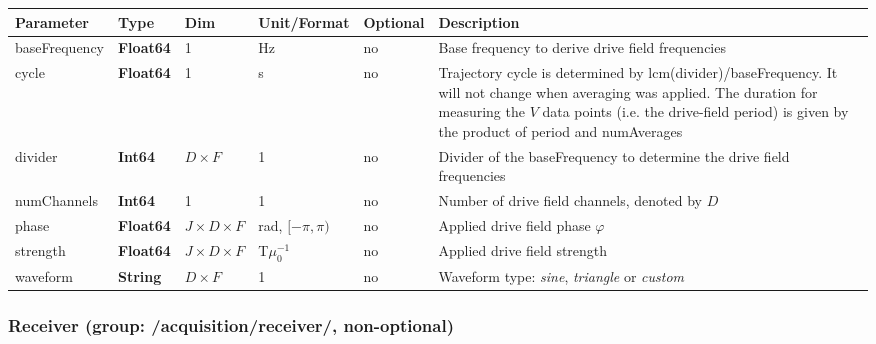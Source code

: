 \documentclass[landscape,a4paper]{article} %
\newcommand{\inltab}[1]{{\ttfamily\bfseries\color{blue}#1}}
\newcommand{\inlvar}[1]{{\ttfamily#1}}
\begin{document}
\setlength\extrarowheight{5pt}
\noindent \begin{tabularx}{\columnwidth}{lllllX} 
\textbf{Parameter} & \textbf{Type} & \textbf{Dim} & \textbf{Unit/Format} & \textbf{Optional} & \textbf{Description} \\ \hline 
\inlvar{baseFrequency} & \inltab{Float64} & 1 & Hz & no & Base frequency to derive drive field frequencies \\ \hline
\inlvar{cycle} & \inltab{Float64} & 1 & s & no & Trajectory cycle is determined by lcm(\inlvar{divider})/\inlvar{baseFrequency}. It will not change when averaging was applied. The duration for measuring the $V$ data points (i.e. the drive-field period) is given by the product of  \inlvar{period} and \inlvar{numAverages} \\ \hline
\inlvar{divider} & \inltab{Int64} & $D \times F$ & 1 & no & Divider of the \inlvar{baseFrequency} to determine the drive field frequencies \\ \hline
\inlvar{numChannels} & \inltab{Int64} & 1 & 1 & no & Number of drive field channels, denoted by $D$ \\ \hline
\inlvar{phase} & \inltab{Float64} & $J \times D \times F$ & rad, $[-\pi,\pi)$ & no & Applied drive field phase $\varphi$\\ \hline
\inlvar{strength} & \inltab{Float64} & $J \times D \times F $ & T$\mu_0^{-1}$ & no & Applied drive field strength \\ \hline
\inlvar{waveform} & \inltab{String} & $D \times F$ & 1 & no & Waveform type: \textit{sine}, \textit{triangle} or \textit{custom} \\ \hline
\end{tabularx}
\setlength\extrarowheight{0pt}


\subsubsection{Receiver (group: \inlvar{/acquisition/receiver/}, non-optional)}
\end{document}
